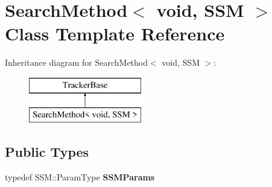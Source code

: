 \hypertarget{classSearchMethod_3_01void_00_01SSM_01_4}{\section{Search\-Method$<$ void, S\-S\-M $>$ Class Template Reference}
\label{classSearchMethod_3_01void_00_01SSM_01_4}
}
Inheritance diagram for Search\-Method$<$ void, S\-S\-M $>$\-:\begin{figure}[H]
\begin{center}
\leavevmode
\includegraphics[height=2.000000cm]{classSearchMethod_3_01void_00_01SSM_01_4}
\end{center}
\end{figure}
\subsection*{Public Types}
\begin{DoxyCompactItemize}
\item 
\hypertarget{classSearchMethod_3_01void_00_01SSM_01_4_ab07b7c30055bb307d7c96849c51475f4}{typedef S\-S\-M\-::\-Param\-Type {\bfseries S\-S\-M\-Params}}\label{classSearchMethod_3_01void_00_01SSM_01_4_ab07b7c30055bb307d7c96849c51475f4}

\end{DoxyCompactItemize}
